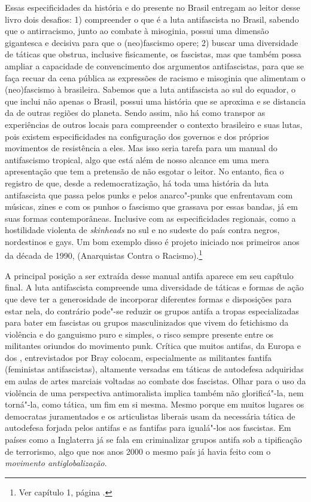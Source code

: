Essas especificidades da história e do presente no Brasil entregam ao
leitor desse livro dois desafios: 1) compreender o que é a luta
antifascista no Brasil, sabendo que o antirracismo, junto ao combate à
misoginia, possui uma dimensão gigantesca e decisiva para que o
(neo)fascismo opere; 2) buscar uma diversidade de táticas que obstrua,
inclusive fisicamente, os fascistas, mas que também possa ampliar a
capacidade de convencimento dos argumentos antifascistas, para que se
faça recuar da cena pública as expressões de racismo e misoginia que
alimentam o (neo)fascismo à brasileira. Sabemos que a luta antifascista
ao sul do equador, o que inclui não apenas o Brasil, possui uma história
que se aproxima e se distancia da de outras regiões do planeta. Sendo
assim, não há como transpor as experiências de outros locais para
compreender o contexto brasileiro e suas lutas, pois existem
especificidades na configuração dos governos e dos próprios movimentos
de resistência a eles. Mas isso seria tarefa para um manual do
antifascismo tropical, algo que está além de nosso alcance em uma mera
apresentação que tem a pretensão de não esgotar o leitor. No entanto,
fica o registro de que, desde a redemocratização, há toda uma história
da luta antifascista que passa pelos punks e pelos anarco"-punks que
enfrentavam com músicas, zines e com os punhos o fascismo que grassava
por essas bandas, já em suas formas contemporâneas. Inclusive com as
especificidades regionais, como a hostilidade violenta de
\emph{skinheads} no sul e no sudeste do país contra negros, nordestinos
e gays. Um bom exemplo disso é projeto iniciado nos primeiros anos da
década de 1990,  (Anarquistas Contra o Racismo).\footnote{Ver capítulo 1, página \pageref{acr}.}

A principal posição a ser extraída desse manual antifa aparece em seu
capítulo final. A luta antifascista compreende uma diversidade de
táticas e formas de ação que deve ter a generosidade de incorporar
diferentes formas e disposições para estar nela, do contrário pode"-se
reduzir os grupos antifa a tropas especializadas para bater em fascistas
ou grupos masculinizados que vivem do fetichismo da violência e do
ganguismo puro e simples, o risco sempre presente entre os militantes
oriundos do movimento punk. Crítica que muitos antifas, da Europa e dos
, entrevistados por Bray colocam, especialmente as militantes fantifa
(feministas antifascistas), altamente versadas em táticas de autodefesa
adquiridas em aulas de artes marciais voltadas ao combate dos fascistas.
Olhar para o uso da violência de uma perspectiva antimoralista implica
também não glorificá"-la, nem torná"-la, como tática, um fim em si mesma.
Mesmo porque em muitos lugares os democratas juramentados e os
articulistas liberais usam da necessária tática de autodefesa forjada
pelos antifas e as fantifas para igualá"-los aos fascistas. Em países
como a Inglaterra já se fala em criminalizar grupos antifa sob a
tipificação de terrorismo, algo que nos anos 2000 o mesmo país já havia
feito com o \emph{movimento antiglobalização}.

